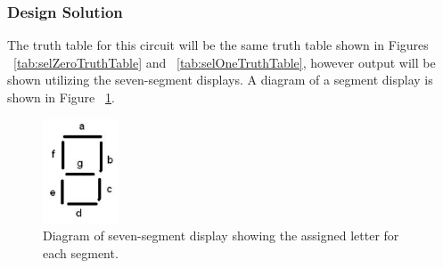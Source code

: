 \documentclass[11pt]{article}
\begin{document}
\subsubsection{Design Solution}
The truth table for this circuit will be the same truth table shown in Figures ~\ref{tab:selZeroTruthTable} and ~\ref{tab:selOneTruthTable}, however output will be shown utilizing the seven-segment displays. A diagram of a segment display is shown in Figure ~\ref{fig:sevenSegFigure}.

\begin{figure}[h]
\begin{center}
	\includegraphics[width=0.2\textwidth]{../Lab2/report-images/img1.png}
	\caption{\label{fig:sevenSegFigure}Diagram of seven-segment display showing the assigned letter for each segment.}
\end{center}
\end{figure}
\end{document}
